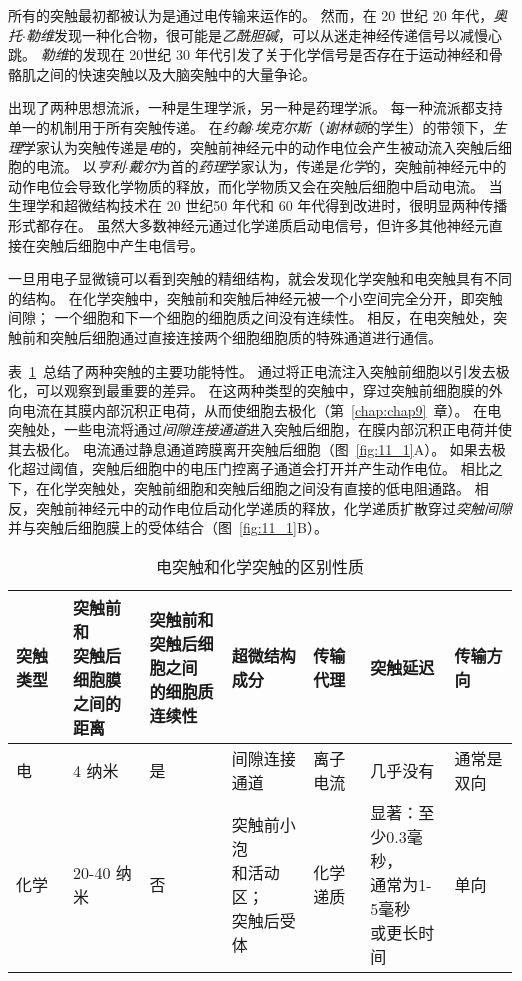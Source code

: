 所有的突触最初都被认为是通过电传输来运作的。
然而，在 20 世纪 20  年代，\textit{奥托$\cdot$勒维}发现一种化合物，很可能是\textit{乙酰胆碱}，可以从迷走神经传递信号以减慢心跳。
\textit{勒维}的发现在 20世纪 30 年代引发了关于化学信号是否存在于运动神经和骨骼肌之间的快速突触以及大脑突触中的大量争论。


出现了两种思想流派，一种是生理学派，另一种是药理学派。
每一种流派都支持单一的机制用于所有突触传递。
在\textit{约翰$\cdot$埃克尔斯}（\textit{谢林顿}的学生）的带领下，\textit{生理}学家认为突触传递是\textit{电}的，突触前神经元中的动作电位会产生被动流入突触后细胞的电流。
以\textit{亨利$\cdot$戴尔}为首的\textit{药理}学家认为，传递是\textit{化学}的，突触前神经元中的动作电位会导致化学物质的释放，而化学物质又会在突触后细胞中启动电流。
当生理学和超微结构技术在 20 世纪50 年代和 60 年代得到改进时，很明显两种传播形式都存在。
虽然大多数神经元通过化学递质启动电信号，但许多其他神经元直接在突触后细胞中产生电信号。


一旦用电子显微镜可以看到突触的精细结构，就会发现化学突触和电突触具有不同的结构。
在化学突触中，突触前和突触后神经元被一个小空间完全分开，即突触间隙；
一个细胞和下一个细胞的细胞质之间没有连续性。
相反，在电突触处，突触前和突触后细胞通过直接连接两个细胞细胞质的特殊通道进行通信。


表~\ref{tab:11_1}~总结了两种突触的主要功能特性。
通过将正电流注入突触前细胞以引发去极化，可以观察到最重要的差异。
在这两种类型的突触中，穿过突触前细胞膜的外向电流在其膜内部沉积正电荷，从而使细胞去极化（第~\ref{chap:chap9}~章）。
在电突触处，一些电流将通过\textit{间隙连接通道}进入突触后细胞，在膜内部沉积正电荷并使其去极化。
电流通过静息通道跨膜离开突触后细胞（图~\ref{fig:11_1}A）。
如果去极化超过阈值，突触后细胞中的电压门控离子通道会打开并产生动作电位。
相比之下，在化学突触处，突触前细胞和突触后细胞之间没有直接的低电阻通路。
相反，突触前神经元中的动作电位启动化学递质的释放，化学递质扩散穿过\textit{突触间隙}并与突触后细胞膜上的受体结合（图~\ref{fig:11_1}B）。


\begin{table}[htbp]
	\caption{电突触和化学突触的区别性质} \label{tab:11_1} \centering
	\begin{tabular}{lllllll}
		\toprule
		突触类型 & \makecell{突触前和\\突触后细胞膜\\之间的距离} & \makecell{突触前和\\突触后细胞之间\\的细胞质连续性} & 超微结构成分 & 传输代理 & 突触延迟 & 传输方向 \\
		\midrule
		电 & 4 纳米 & 是 & 间隙连接通道 & 离子电流 & 几乎没有 & 通常是双向 \\
		化学 & 20-40 纳米 & 否 & \makecell[l]{突触前小泡\\和活动区；\\突触后受体} & 化学递质 & \makecell[l]{显著：至\\少0.3毫秒，\\通常为1-5毫秒\\或更长时间} & 单向 \\
		\bottomrule
	\end{tabular}
\end{table}


